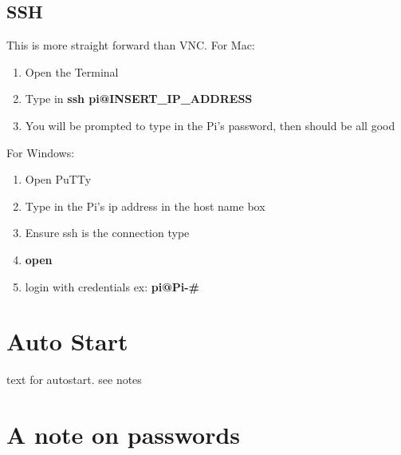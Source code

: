 \documentclass[12pt]{extarticle}
\begin{document}
\subsection{SSH}
This is more straight forward than VNC. \newline \newline For Mac:
\begin{enumerate}
  \item Open the Terminal
  \item Type in \textbf{ssh pi@INSERT\_IP\_ADDRESS}
  \item You will be prompted to type in the Pi's password, then should be all good
\end{enumerate}
For Windows:
\begin{enumerate}
  \item Open PuTTy
  \item Type in the Pi's ip address in the host name box
  \item Ensure ssh is the connection type
  \item \textbf{open}
  \item login with credentials ex: \textbf{pi@Pi-\#}
\end{enumerate}

\newpage
\section{Auto Start}
text for autostart. see notes

\section{A note on passwords}
\end{document}
